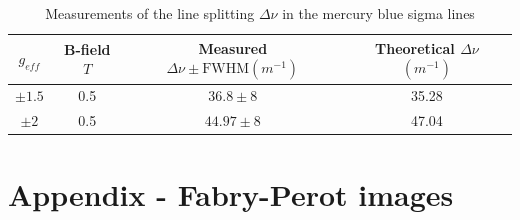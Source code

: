 \documentclass[11pt]{article}
\begin{document}
\begin{table}[h!]
    \centering
    \begin{tabular}{c|ccc}
    \toprule
         \( g_{eff} \) & B-field $\si{T}$ &  Measured $\Delta \nu \pm \mathrm{FWHM } (\si{m^{-1}})$ & Theoretical $\Delta \nu$ $(\si{m^{-1}})$\\
         \midrule
         $\pm 1.5$& 0.5 & $36.8 \pm 8$ & 35.28 \\
         $\pm 2$ & 0.5 & $44.97 \pm 8$ & 47.04 \\
    \end{tabular}
    \caption{Measurements of the line splitting $\Delta \nu$ in the mercury blue sigma lines}
    \label{tab: Hg blue sigma measurements}
\end{table}

\newpage
\section{Appendix - Fabry-Perot images}
\end{document}
